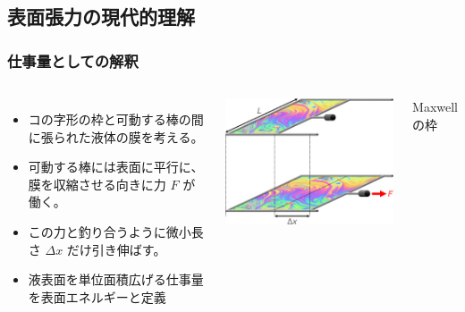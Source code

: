 \documentclass[unicode,12pt]{beamer}%
\begin{document}
\subsection{表面張力の現代的理解}
\begin{frame}
	\frametitle{仕事量としての解釈}
	\vspace{-3mm}
	\begin{columns}[c, onlytextwidth]
				\begin{itemize}
					\item コの字形の枠と可動する棒の間に張られた液体の膜を考える。
					\item 可動する棒には表面に平行に、膜を収縮させる向きに力 $F$ が働く。
					\item この力と釣り合うように微小長さ $\Delta x$ だけ引き伸ばす。
					\item \alert{液表面を単位面積広げる仕事量}を表面エネルギーと定義
				\end{itemize}
		\centering
		\includegraphics[width=\textwidth]{maxwells-frame.jpg}

		\vspace{2mm}
		Maxwell の枠
	\end{columns}
	


\end{frame}
\end{document}
